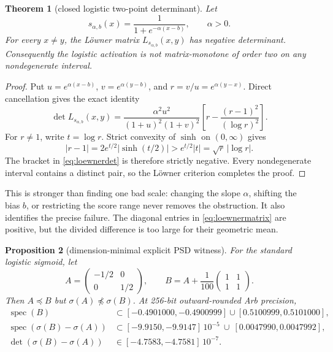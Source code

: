 \documentclass[11pt]{article}
\newtheorem{theorem}{Theorem}[section]
\newtheorem{proposition}[theorem]{Proposition}
\begin{document}
\begin{theorem}[closed logistic two-point determinant]
\label{thm:loewner}
Let
\[
 s_{\alpha,b}(x)=\frac1{1+e^{-\alpha(x-b)}},\qquad \alpha>0.
\]
For every $x\ne y$, the L\"owner matrix $L_{s_{\alpha,b}}(x,y)$ has negative determinant.  Consequently the
logistic activation is not matrix-monotone of order two on any nondegenerate interval.
\end{theorem}

\begin{proof}
Put $u=e^{\alpha(x-b)}$, $v=e^{\alpha(y-b)}$, and $r=v/u=e^{\alpha(y-x)}$.  Direct cancellation gives the exact
identity
\begin{equation}
 \det L_{s_{\alpha,b}}(x,y)
 =\frac{\alpha^2u^2}{(1+u)^2(1+v)^2}
 \left[r-\frac{(r-1)^2}{(\log r)^2}\right].
 \label{eq:loewnerdet}
\end{equation}
For $r\ne1$, write $t=\log r$.  Strict convexity of $\sinh$ on $(0,\infty)$ gives
\[
 |r-1|=2e^{t/2}|\sinh(t/2)|>e^{t/2}|t|=\sqrt r\,|\log r|.
\]
The bracket in \eqref{eq:loewnerdet} is therefore strictly negative.  Every nondegenerate interval contains a
distinct pair, so the L\"owner criterion completes the proof.
\end{proof}

This is stronger than finding one bad scale: changing the slope $\alpha$, shifting the bias $b$, or restricting the
score range never removes the obstruction.  It also identifies the precise failure.  The diagonal entries in
\eqref{eq:loewnermatrix} are positive, but the divided difference is too large for their geometric mean.

\begin{proposition}[dimension-minimal explicit PSD witness]
\label{prop:witness}
For the standard logistic sigmoid, let
\begin{equation}
 A=\begin{pmatrix}-1/2&0\\0&1/2\end{pmatrix},\qquad
 B=A+\frac1{100}\begin{pmatrix}1&1\\1&1\end{pmatrix}.
 \label{eq:witness}
\end{equation}
Then $A\preceq B$ but $\sigma(A)\npreceq\sigma(B)$.  At 256-bit outward-rounded Arb precision,
\begin{align}
 \operatorname{spec}(B)&\subset[-0.4901000,-0.4900999]\cup[0.5100999,0.5101000],\\
 \operatorname{spec}(\sigma(B)-\sigma(A))
 &\subset[-9.9150,-9.9147]\,10^{-5}\ \cup\ [0.0047990,0.0047992],\label{eq:witnessspec}\\
 \det(\sigma(B)-\sigma(A))&\in[-4.7583,-4.7581]\,10^{-7}.
\end{align}
\end{proposition}
\end{document}
